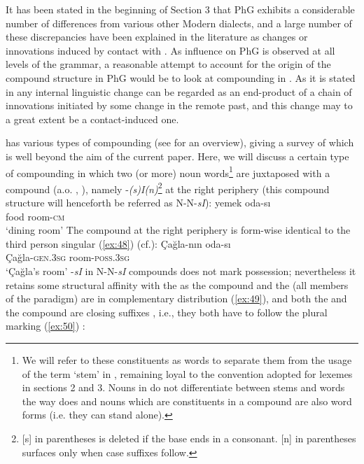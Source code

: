 \documentclass[output=paper]{LSP/langsci}
\begin{document}
It has been stated in the beginning of Section 3 that PhG exhibits a considerable number of differences from various other Modern  dialects, and a large number of these discrepancies have been explained in the literature as changes or innovations induced by contact with  \citep{Dawkins1916,Andriotis1948,Karatsareas2011,Karatsareas2014,Bagriacik}. As  influence on PhG is observed at all levels of the grammar, a reasonable attempt to account for the origin of the compound structure in PhG would be to look at compounding in . As it is stated in \citet{Thomasonforth} any internal linguistic change can be regarded as an end-product of a chain of innovations initiated by some change in the remote past, and this change may to a great extent be a contact-induced one. 

 has various types of compounding (see \citealt{Goksel2009,GokselHaznedar2007} for an overview), giving a survey of which is well beyond the aim of the current paper. Here, we will discuss a certain type of compounding in which two (or more) noun words\footnote{We will refer to these constituents as words to separate them from the usage of the term ‘stem’ in , remaining loyal to the convention adopted for  lexemes in sections 2 and 3. Nouns in  do not differentiate between stems and words the way  does and nouns which are constituents in a compound are also word forms (i.e. they can stand alone).} are juxtaposed with a compound  (a.o. \citealt[474]{Kornfilt1997}, \citealt{Goksel1988,Schaaik2002}), namely -\textit{(s)I(n)}\footnote{[s] in parentheses is deleted if the base ends in a consonant. [n] in parentheses surfaces only when case suffixes follow.} at the right periphery (this compound structure will henceforth be referred as N-N-\textit{sI}):
\ea\label{ex:47}
	\gll 	yemek oda-sı\\
			food room-\textsc{cm}\\
	\glt `dining room'
\z
The compound  at the right periphery is form-wise identical to the third person singular   (\ref{ex:48}) (cf.\citealt{Goksel2009}):
\ea\label{ex:48}
	\gll Çağla-nın oda-sı\\
			Çağla-\textsc{gen.3sg} room-\textsc{poss.3sg}\\
	\glt `Çağla's room'
\z
-\textit{sI} in N-N-\textit{sI} compounds does not mark possession; nevertheless it retains some structural affinity with the   as the compound  and the   (all members of the paradigm) are in complementary distribution (\ref{ex:49}), and both the   and the compound  are closing suffixes \citep{Goksel2009}, i.e., they both have to follow the plural marking (\ref{ex:50}) \citep{Lewis1967,Dede1978, Kornfilt1986,Goksel1988,Goksel1993,Schroeder1999,Schaaik2002}:
\end{document}
